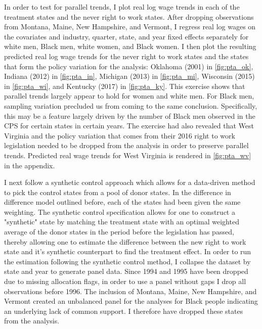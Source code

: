 \documentclass[11pt]{article}
\begin{document}
In order to test for parallel trends, I plot real log wage trends in each of the treatment states and the never right to work states. After dropping observations from Montana, Maine, New Hampshire, and Vermont, I regress real log wages on the covariates and industry, quarter, state, and year fixed effects separately for white men, Black men, white women, and Black women. I then plot the resulting predicted real log wage trends for the never right to work states and the states that form the policy variation for the analysis: Oklahoma (2001) in \autoref{fig:pta_ok}, Indiana (2012) in \autoref{fig:pta_in}, Michigan (2013) in \autoref{fig:pta_mi}, Wisconsin (2015) in \autoref{fig:pta_wi}, and Kentucky (2017) in \autoref{fig:pta_ky}. This exercise shows that parallel trends largely appear to hold for women and white men. For Black men, sampling variation precluded us from coming to the same conclusion. Specifically, this may be a feature largely driven by the number of Black men observed in the CPS for certain states in certain years. The exercise had also revealed that West Virginia and the policy variation that comes from their 2016 right to work legislation needed to be dropped from the analysis in order to preserve parallel trends. Predicted real wage trends for West Virginia is rendered in \autoref{fig:pta_wv} in the appendix.

I next follow a synthetic control approach which allows for a data-driven method to pick the control states from a pool of donor states. In the difference in difference model outlined before, each of the states had been given the same weighting. The synthetic control specification allows for one to construct a "synthetic" state by matching the treatment state with an optimal weighted average of the donor states in the period before the legislation has passed, thereby allowing one to estimate the difference between the new right to work state and it's synthetic counterpart to find the treatment effect. In order to run the estimation following the synthetic control method, I collapse the dataset by state and year to generate panel data. Since 1994 and 1995 have been dropped due to missing allocation flags, in order to use a panel without gaps I drop all observations before 1996. The inclusion of Montana, Maine, New Hampshire, and Vermont created an unbalanced panel for the analyses for Black people indicating an underlying lack of common support. I therefore have dropped these states from the analysis. 
\end{document}
